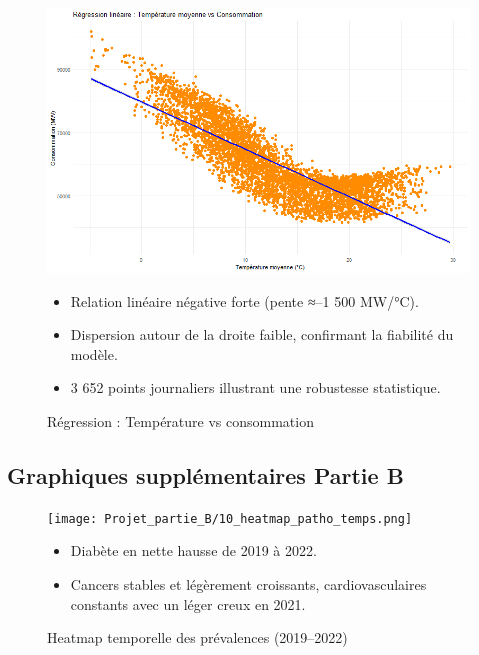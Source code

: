 \documentclass[12pt,a4paper]{article}
\begin{document}
\begin{figure}[H]
  \centering
  \begin{minipage}[t]{0.48\textwidth}
    \centering
    \includegraphics[width=\linewidth]{Projet_partie_A/regression_temp_vs_conso.png}
    \caption{Régression : Température vs consommation}
    \label{fig:regression_temp_conso}
  \end{minipage}
  \hfill
  \begin{minipage}[t]{0.48\textwidth}
    \small
    \begin{itemize}
      \item Relation linéaire négative forte (pente ≈–1 500 MW/°C).  
      \item Dispersion autour de la droite faible, confirmant la fiabilité du modèle.  
      \item 3 652 points journaliers illustrant une robustesse statistique.  
    \end{itemize}
  \end{minipage}
\end{figure}

\subsection{Graphiques supplémentaires Partie B}

\begin{figure}[H]
  \centering
  \begin{minipage}[t]{0.48\textwidth}
    \centering
    \texttt{[image: Projet\_partie\_B/10\_heatmap\_patho\_temps.png]}
    \caption{Heatmap temporelle des prévalences (2019–2022)}
    \label{fig:heatmap_temps}
  \end{minipage}
  \hfill
  \begin{minipage}[t]{0.48\textwidth}
    \small
    \begin{itemize}
      \item Diabète en nette hausse de 2019 à 2022.  
      \item Cancers stables et légèrement croissants, cardiovasculaires constants avec un léger creux en 2021.
    \end{itemize}
  \end{minipage}
\end{figure}
\end{document}
